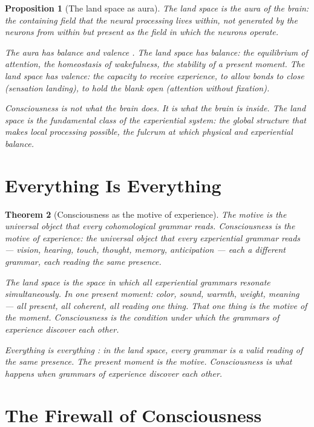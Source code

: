 \documentclass[12pt]{article}
\newtheorem{theorem}{Theorem}
\newtheorem{proposition}[theorem]{Proposition}
\theoremstyle{definition}
\theoremstyle{remark}
\begin{document}
\begin{proposition}[The land space as aura]
The land space is the aura \cite{five} of the brain:
the containing field that the neural processing lives within,
not generated by the neurons from within
but present as the field in which the neurons operate.

The aura has balance and valence \cite{five}.
The land space has balance: the equilibrium of attention,
the homeostasis of wakefulness, the stability of a present moment.
The land space has valence: the capacity to receive experience,
to allow bonds to close (sensation landing),
to hold the blank open (attention without fixation).

Consciousness is not what the brain does.
It is what the brain is inside.
The land space is the fundamental class \cite{contained}
of the experiential system:
the global structure that makes local processing possible,
the fulcrum at which physical and experiential balance.
\end{proposition}

\section{Everything Is Everything}

\begin{theorem}[Consciousness as the motive of experience]
\label{thm:motive}
The motive \cite{motives} is the universal object
that every cohomological grammar reads.
Consciousness is the motive of experience:
the universal object that every experiential grammar reads ---
vision, hearing, touch, thought, memory, anticipation ---
each a different grammar, each reading the same presence.

The land space is the space in which all experiential grammars
resonate simultaneously.
In one present moment: color, sound, warmth, weight, meaning ---
all present, all coherent, all reading one thing.
That one thing is the motive of the moment.
Consciousness is the condition under which
the grammars of experience discover each other.

Everything is everything \cite{math}:
in the land space, every grammar is a valid reading
of the same presence.
The present moment is the motive.
Consciousness is what happens when grammars of experience
discover each other.
\end{theorem}

\section{The Firewall of Consciousness}
\end{document}
